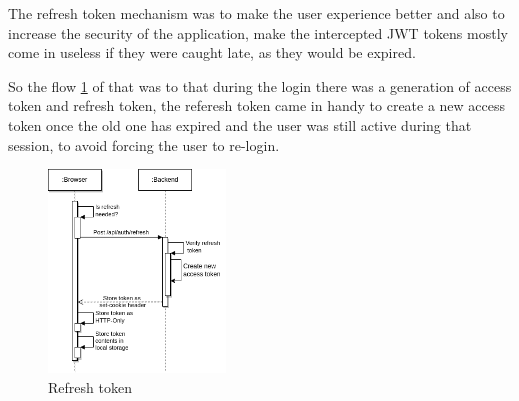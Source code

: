 The refresh token mechanism was to make the user experience better and also to increase
the security of the application, make the intercepted JWT tokens mostly come in useless
if they were caught late, as they would be expired.

So the flow \ref{fig:refresh} of that was to that during the login there was a generation
of access token and refresh token, the referesh token came in handy to create a new access
token once the old one has expired and the user was still active during that session, to
avoid forcing the user to re-login.

\begin{figure}[!htbp]
    \centering
    \includegraphics[width=0.42\textwidth]{images/refresh.png}
    \caption{\footnotesize{Refresh token}}
    \label{fig:refresh}
\end{figure}

\newpage
